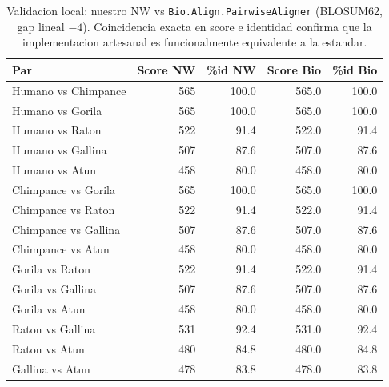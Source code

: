 \begin{table}[h]
\centering
\small
\caption{Validacion local: nuestro NW vs \texttt{Bio.Align.PairwiseAligner} (BLOSUM62, gap lineal $-4$). Coincidencia exacta en score e identidad confirma que la implementacion artesanal es funcionalmente equivalente a la estandar.}
\begin{tabular}{lrrrr}
\toprule
Par & Score NW & \%id NW & Score Bio & \%id Bio \\
\midrule
Humano vs Chimpance & 565 & 100.0 & 565.0 & 100.0 \\
Humano vs Gorila & 565 & 100.0 & 565.0 & 100.0 \\
Humano vs Raton & 522 & 91.4 & 522.0 & 91.4 \\
Humano vs Gallina & 507 & 87.6 & 507.0 & 87.6 \\
Humano vs Atun & 458 & 80.0 & 458.0 & 80.0 \\
Chimpance vs Gorila & 565 & 100.0 & 565.0 & 100.0 \\
Chimpance vs Raton & 522 & 91.4 & 522.0 & 91.4 \\
Chimpance vs Gallina & 507 & 87.6 & 507.0 & 87.6 \\
Chimpance vs Atun & 458 & 80.0 & 458.0 & 80.0 \\
Gorila vs Raton & 522 & 91.4 & 522.0 & 91.4 \\
Gorila vs Gallina & 507 & 87.6 & 507.0 & 87.6 \\
Gorila vs Atun & 458 & 80.0 & 458.0 & 80.0 \\
Raton vs Gallina & 531 & 92.4 & 531.0 & 92.4 \\
Raton vs Atun & 480 & 84.8 & 480.0 & 84.8 \\
Gallina vs Atun & 478 & 83.8 & 478.0 & 83.8 \\
\bottomrule
\end{tabular}
\end{table}